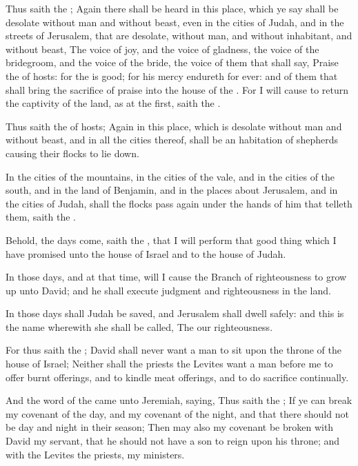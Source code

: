 \verse Thus saith the \LORD; Again there shall be heard in this place, which ye say shall be desolate without man and without beast, even in the cities of Judah, and in the streets of Jerusalem, that are desolate, without man, and without inhabitant, and without beast, \verse The voice of joy, and the voice of gladness, the voice of the bridegroom, and the voice of the bride, the voice of them that shall say, Praise the \LORD of hosts: for the \LORD is good; for his mercy endureth for ever: and of them that shall bring the sacrifice of praise into the house of the \LORD. For I will cause to return the captivity of the land, as at the first, saith the \LORD.

\verse Thus saith the \LORD of hosts; Again in this place, which is desolate without man and without beast, and in all the cities thereof, shall be an habitation of shepherds causing their flocks to lie down.

\verse In the cities of the mountains, in the cities of the vale, and in the cities of the south, and in the land of Benjamin, and in the places about Jerusalem, and in the cities of Judah, shall the flocks pass again under the hands of him that telleth them, saith the \LORD.

\verse Behold, the days come, saith the \LORD, that I will perform that good thing which I have promised unto the house of Israel and to the house of Judah.

\verse In those days, and at that time, will I cause the Branch of righteousness to grow up unto David; and he shall execute judgment and righteousness in the land.

\verse In those days shall Judah be saved, and Jerusalem shall dwell safely: and this is the name wherewith she shall be called, The \LORD our righteousness.

\verse For thus saith the \LORD; David shall never want a man to sit upon the throne of the house of Israel; \verse Neither shall the priests the Levites want a man before me to offer burnt offerings, and to kindle meat offerings, and to do sacrifice continually.

\verse And the word of the \LORD came unto Jeremiah, saying, \verse Thus saith the \LORD; If ye can break my covenant of the day, and my covenant of the night, and that there should not be day and night in their season; \verse Then may also my covenant be broken with David my servant, that he should not have a son to reign upon his throne; and with the Levites the priests, my ministers.

